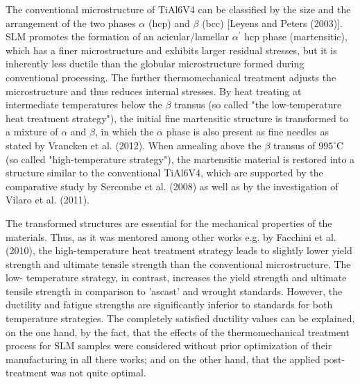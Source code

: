 \documentclass[10pt]{article}
\begin{document}
The conventional microstructure of TiAl6V4 can be classified by the size and the arrangement of the two phases $\alpha$ (hcp) and $\beta$ (bcc) [Leyens and Peters (2003)]. SLM promotes the formation of an acicular/lamellar $\alpha^{\prime}$ hcp phase (martensitic), which has a finer microstructure and exhibits larger residual stresses, but it is inherently less ductile than the globular microstructure formed during conventional processing. The further thermomechanical treatment adjusts the microstructure and thus reduces internal stresses. By heat treating at intermediate temperatures below the $\beta$ transus (so called "the low-temperature heat treatment strategy"), the initial fine martensitic structure is transformed to a mixture of $\alpha$ and $\beta$, in which the $\alpha$ phase is also present as fine needles as stated by Vrancken et al. (2012). When annealing above the $\beta$ transus of $995^{\circ} \mathrm{C}$ (so called "high-temperature strategy"), the martensitic material is restored into a structure similar to the conventional TiAl6V4, which are supported by the comparative study by Sercombe et al. (2008) as well as by the investigation of Vilaro et al. (2011).

The transformed structures are essential for the mechanical properties of the materials. Thus, as it was mentored among other works e.g. by Facchini et al. (2010), the high-temperature heat treatment strategy leads to slightly lower yield strength and ultimate tensile strength than the conventional microstructure. The low- temperature strategy, in contrast, increases the yield strength and ultimate tensile strength in comparison to 'ascast' and wrought standards. However, the ductility and fatigue strengths are significantly inferior to standards for both temperature strategies. The completely satisfied ductility values can be explained, on the one hand, by the fact, that the effects of the thermomechanical treatment process for SLM samples were considered without prior optimization of their manufacturing in all there works; and on the other hand, that the applied post-treatment was not quite optimal.
\end{document}
